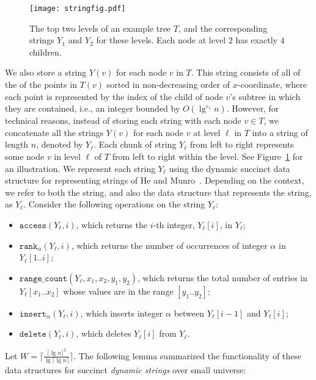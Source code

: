 \documentclass{llncs}
\def\idtt#1{\ensuremath{\mathtt{#1}}}
\def\rankop{\idtt{rank}}
\def\accessop{\idtt{access}}
\def\insertop{\idtt{insert}}
\def\deleteop{\idtt{delete}}
\def\rangecount{\idtt{range\_count}}
\begin{document}
\begin{figure}
\centering
\texttt{[image: stringfig.pdf]}
\caption{\label{fig:stringfig}The top two levels of an example tree
  $T$, and the corresponding strings $Y_1$ and $Y_2$ for these
  levels. Each node at level $2$ has exactly $4$ children.}
\end{figure}


We also store a string $Y(v)$ for each node $v$ in $T$.  This string
consists of all of the of the points in $T(v)$ sorted in
non-decreasing order of $x$-coordinate, where each point is
represented by the index of the child of node $v$'s subtree in which
they are contained, i.e., an integer bounded by
$O(\lg^{\varepsilon_1}n)$.  However, for technical reasons, instead of
storing each string with each node $v \in T$, we concatenate all the
strings $Y(v)$ for each node $v$ at level $\ell$ in $T$ into a string
of length $n$, denoted by $Y_\ell$.  Each chunk of string $Y_\ell$
from left to right represents some node $v$ in level $\ell$ of $T$
from left to right within the level.  See Figure~\ref{fig:stringfig}
for an illustration.  We represent each string $Y_\ell$ using the
dynamic succinct data structure for representing strings of He and
Munro~\cite{HM11}.  Depending on the context, we refer to both the
string, and also the data structure that represents the string, as
$Y_\ell$.  Consider the following operations on the string $Y_\ell$:





\begin{itemize}
\item $\accessop(Y_\ell, i)$, which returns the $i$-th integer,
  $Y_\ell[i]$, in $Y_\ell$;
\item $\rankop_{\alpha}(Y_\ell, i)$, which returns the number of
  occurrences of integer $\alpha$ in $Y_\ell[1..i]$;
\item $\rangecount(Y_\ell, x_1, x_2, y_1, y_2)$, which returns the
  total number of entries in $Y_\ell[x_1..x_2]$ whose values are in
  the range $[y_1..y_2]$;
\item $\insertop_{\alpha}(Y_\ell, i)$, which inserts integer $\alpha$
  between $Y_\ell[i-1]$ and $Y_\ell[i]$;
\item $\deleteop(Y_\ell, i)$, which deletes $Y_\ell[i]$ from $Y_\ell$. 
\end{itemize} 





Let $W = \lceil \frac{\lceil \lg n \rceil^2}{\lg \lceil \lg
  n\rceil}\rceil$.  The following lemma summarized the functionality
of these data structures for succinct \emph{dynamic strings} over
small universe:
\end{document}
